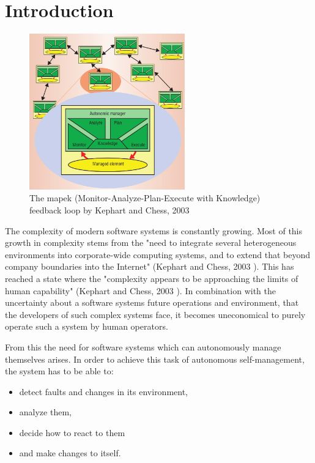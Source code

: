 \section{Introduction}
\label{ch:Introduction}

\begin{figure}[hbt!]
    \centering
    \includegraphics[width=0.6\textwidth]{images/MAPEK.png}
    \caption{The \acrshort{mapek} (Monitor-Analyze-Plan-Execute with Knowledge) feedback loop by Kephart and Chess, 2003 \cite*{VisionOfAutonomicComputing}}
    \label{fig:MAPEK}
\end{figure}

The complexity of modern software systems is constantly growing.
Most of this growth in complexity stems from the
"need to integrate several heterogeneous environments into corporate-wide computing systems,
and to extend that beyond company boundaries into the Internet" (Kephart and Chess, 2003 \cite*{VisionOfAutonomicComputing}).
This has reached a state where the
"complexity appears to be approaching the limits of human capability" (Kephart and Chess, 2003 \cite*{VisionOfAutonomicComputing}).
In combination with the uncertainty about a software systems future operations and environment,
that the developers of such complex systems face, it becomes uneconomical to purely operate such a system by human operators.

\noindent From this the need for software systems which can autonomously manage themselves arises.
In order to achieve this task of autonomous self-management, the system has to be able to:
\begin{itemize}[nosep]
    \item detect faults and changes in its environment,
    \item analyze them,
    \item decide how to react to them
    \item and make changes to itself.
\end{itemize}

